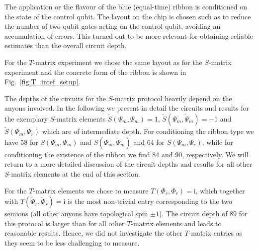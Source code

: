 \documentclass[two column]{article}
\begin{document}
The application or the flavour of the blue (equal-time) ribbon is conditioned on the state of the control qubit.
The layout on the chip is chosen such as to reduce the number of two-qubit gates acting on the control qubit, avoiding an accumulation of errors. This turned out to be more relevant for obtaining reliable estimates than the overall circuit depth. 

For the $T$-matrix experiment we chose the same layout as for the $S$-matrix experiment and the concrete form of the ribbon is shown in Fig.~\ref{fig:T_intef_setup}.

The depths of the circuits for the $S$-matrix protocol heavily depend on the anyons involved.
In the following we present in detail the circuits and results for the exemplary $S$-matrix elements $\tilde{S}(\Psi_m, \Psi_m)=1$, $\tilde{S}(\Psi_m, \tilde{\Psi}_m)=-1$ and $\tilde{S}(\Psi_m, \Psi_r)$ which are of intermediate depth. For conditioning the ribbon type we have 58 for $S(\Psi_m, \Psi_m)$ and $S(\Psi_m, \tilde{\Psi}_m)$	 and 64  for $S(\Psi_m, \Psi_r)$, while for conditioning the existence of the ribbon we find 84 and 90, respectively. We will return to a more detailed discussion of the circuit depths and results for all other $S$-matrix elements at the end of this section.

For the $T$-matrix elements we chose to measure $T(\Phi_r,\Phi_r)=\mathrm i$, which together with $T(\tilde{\Phi}_r,\tilde{\Phi}_r)=\mathrm i$ is the most non-trivial entry corresponding to the two semions (all other anyons have topological spin $\pm 1$). The circuit depth of 89 for this protocol is larger than for all other $T$-matrix elements and leads to reasonable results. Hence, we did not investigate the other $T$-matrix entries as they seem to be less challenging to measure.

%
%
%
\end{document}
